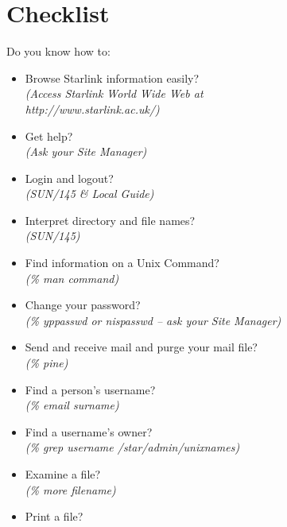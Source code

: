 \documentclass[twoside]{article}
\newcommand{\htmladdnormallink}[2]{#1}
\newcommand{\xref}[3]{#1}
\begin{document}
\newpage

\section {\label{AppendixB}Checklist}
Do you know how to:
\begin{itemize}
\item Browse Starlink information easily?\\
\hspace*{10mm} {\em (Access
               \htmladdnormallink{Starlink World Wide Web}
                                 {http://www.starlink.ac.uk/} at\\
\hspace*{10mm} http://www.starlink.ac.uk/)}
\item Get help?\\
\hspace*{10mm} {\em (Ask your Site Manager)}
\item Login and logout?\\
\hspace*{10mm} {\em (\xref{SUN/145}{sun145}{} \& Local Guide)}
\item Interpret directory and file names?\\
\hspace*{10mm} {\em (\xref{SUN/145}{sun145}{})}
\item Find information on a Unix Command?\\
\hspace*{10mm} {\em (\% man command)}
\item Change your password?\\
\hspace*{10mm} {\em (\% yppasswd or nispasswd -- ask your Site Manager)}
\item Send and receive mail and purge your mail file?\\
\hspace*{10mm} {\em (\% pine)}
\item Find a person's username?\\
\hspace*{10mm} {\em (\% email surname)}
\item Find a username's owner?\\
\hspace*{10mm} {\em (\% grep username /star/\-admin/\-unixnames)}
\item Examine a file?\\
\hspace*{10mm} {\em (\% more filename)}
\item Print a file?\\

\end{itemize}
\end{document}
